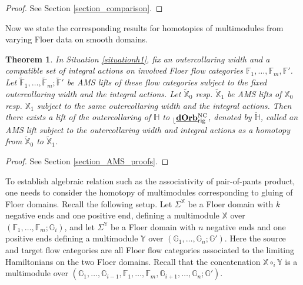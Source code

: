 \documentclass[reqno, 10pt]{amsart}
\numberwithin{equation}{section}
\numberwithin{equation}{section}
\newtheorem{thma}{Theorem}
\theoremstyle{definition}
\theoremstyle{remark}
\newcommand{\mb}{\mathbb}
\renewcommand{\outer}{{}_{\lfloor}}
\newcommand{\uds}[1]{\underline{\smash{#1}}}
\begin{document}
\begin{proof}
See Section \ref{section_comparison}.
\end{proof}








Now we state the corresponding results for homotopies of multimodules from varying Floer data on smooth domains.

\begin{thma}\label{thma_homotopy_lift}
In Situation \ref{situationh1}, fix an outercollaring width and a compatible set of integral actions on involved Floer flow categories ${\mb F}_1, \ldots, {\mb F}_m, {\mb F}'$. Let $\tilde {\mb F}_1, \ldots, \tilde {\mb F}_m; \tilde {\mb F}'$ be AMS lifts of these flow categories subject to the fixed outercollaring width and the integral actions. Let $\tilde {\mb X}_0$ resp. $\tilde {\mb X}_1$ be AMS lifts of ${\mb X}_0$ resp. ${\mb X}_1$ subject to the same outercollaring width and the integral actions. Then there exists a lift of the outercollaring of ${\mb H}$ to $\outer \uds{\bf dOrb}_{\rm rig}^{\rm NC}$, denoted by $\tilde {\mb H}$, called an AMS lift subject to the outercollaring width and integral actions as a homotopy from $\tilde {\mb X}_0$ to $\tilde {\mb X}_1$.
\end{thma}

\begin{proof}
See Section \ref{section_AMS_proofs}.
\end{proof}



To establish algebraic relation such as the associativity of pair-of-pants product, one needs to consider the homotopy of multimodules corresponding to gluing of Floer domains. Recall the following setup. Let $\Sigma^{\mb X}$ be a Floer domain with $k$ negative ends and one positive end, defining a multimodule ${\mb X}$ over $({\mb F}_1, \ldots, {\mb F}_m; {\mb G}_i)$, and let $\Sigma^{\mb Y}$ be a Floer domain with $n$ negative ends and one positive ends defining a multimodule ${\mb Y}$ over $({\mb G}_1, \ldots, {\mb G}_n; {\mb G}')$. Here the source and target flow categories are all Floer flow categories associated to the limiting Hamiltonians on the two Floer domains. Recall that the concatenation ${\mb X} \circ_i {\mb Y}$ is a multimodule over $({\mb G}_1, \ldots, {\mb G}_{i-1}, {\mb F}_1, \ldots, {\mb F}_m, {\mb G}_{i+1}, \ldots, {\mb G}_n; {\mb G}')$. 
\end{document}
